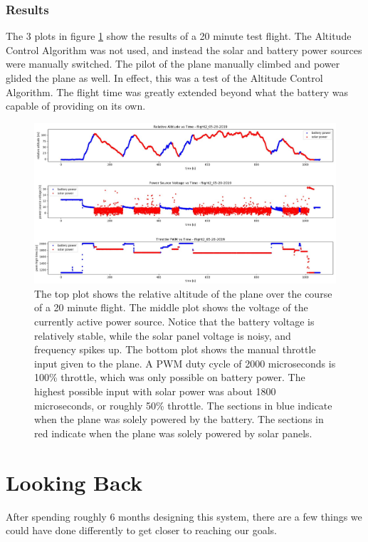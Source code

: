 \documentclass[12pt,journal,compsoc]{IEEEtran}
\begin{document}
\subsubsection{Results}
The 3 plots in figure \ref{flight_altitude_voltage_pwm_plot} show the results of a 20 minute test flight. The Altitude Control Algorithm was not used, and instead the solar and battery power sources were manually switched. The pilot of the plane manually climbed and power glided the plane as well. In effect, this was a test of the Altitude Control Algorithm. The flight time was greatly extended beyond what the battery was capable of providing on its own.

\begin{figure}[h!]
\hspace*{0cm}
\centering
\includegraphics[width=\textwidth]{alt_vs_time_flight2_05-28-2019.jpg}
\caption{The top plot shows the relative altitude of the plane over the course of a 20 minute flight. The middle plot shows the voltage of the currently active power source. Notice that the battery voltage is relatively stable, while the solar panel voltage is noisy, and frequency spikes up. The bottom plot shows the manual throttle input given to the plane. A PWM duty cycle of 2000 microseconds is 100\% throttle, which was only possible on battery power. The highest possible input with solar power was about 1800 microseconds, or roughly 50\% throttle. The sections in blue indicate when the plane was solely powered by the battery. The sections in red indicate when the plane was solely powered by solar panels.}
\label{flight_altitude_voltage_pwm_plot}
\end{figure}

\section{Looking Back}
After spending roughly 6 months designing this system, there are a few things we could have done differently to get closer to reaching our goals.
\end{document}
